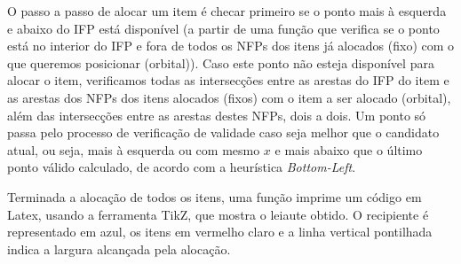 \documentclass{article}
\begin{document}
O passo a passo de alocar um item é checar primeiro se o ponto mais à esquerda e abaixo do IFP está disponível (a partir de uma função que verifica se o ponto está no interior do IFP e fora de todos os NFPs dos itens já alocados (fixo) com o que queremos posicionar (orbital)). Caso este ponto não esteja disponível para alocar o item, verificamos todas as intersecções entre as arestas do IFP do item e as arestas dos NFPs dos itens alocados (fixos) com o item a ser alocado (orbital), além das intersecções entre as arestas destes NFPs, dois a dois. Um ponto só passa pelo processo de verificação de validade caso seja melhor que o candidato atual, ou seja, mais à esquerda ou com mesmo $x$ e mais abaixo que o último ponto válido calculado, de acordo com a heurística {\it Bottom-Left}.

Terminada a alocação de todos os itens, uma função imprime um código em Latex, usando a ferramenta TikZ, que mostra o leiaute obtido. O recipiente é representado em azul, os itens em vermelho claro e a linha vertical pontilhada indica a largura alcançada pela alocação.

\end{document}
